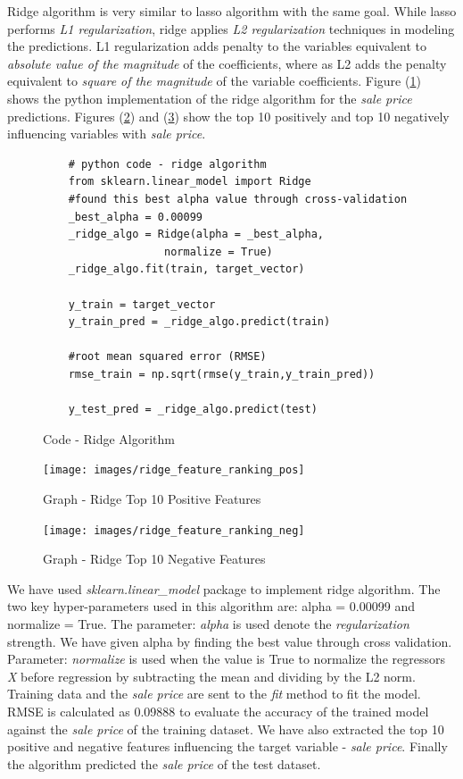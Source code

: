 \documentclass[sigconf]{acmart}
\begin{document}
	Ridge algorithm is very similar to lasso algorithm with the same goal. While lasso performs {\em L1 regularization}, ridge applies {\em L2 regularization} techniques in modeling the predictions. L1 regularization adds penalty to the variables equivalent to {\em absolute value of the magnitude} of the coefficients, where as L2 adds the penalty equivalent to {\em square of the magnitude} of the variable coefficients. Figure (\ref{c:ridge}) shows the python implementation of the ridge algorithm for the {\em sale price} predictions. Figures ({\ref{fig:ridge-feature-ranking-pos}}) and (\ref{fig:ridge-feature-ranking-neg}) show the top 10 positively and top 10 negatively influencing variables with {\em sale price}.
		
	\begin{figure}[htb]
	\begin{verbatim}
	# python code - ridge algorithm
	from sklearn.linear_model import Ridge
	#found this best alpha value through cross-validation
	_best_alpha = 0.00099	
	_ridge_algo = Ridge(alpha = _best_alpha, 
	               normalize = True)	               	
	_ridge_algo.fit(train, target_vector)
		
	y_train = target_vector
	y_train_pred = _ridge_algo.predict(train)
	
	#root mean squared error (RMSE)
	rmse_train = np.sqrt(rmse(y_train,y_train_pred))	
	
	y_test_pred = _ridge_algo.predict(test)	

	\end{verbatim}
	\caption{Code - Ridge Algorithm} \label{c:ridge} 
	\end{figure}
		
	\begin{figure}[htb]
		\centering
		\texttt{[image: images/ridge\_feature\_ranking\_pos]}	
		\caption{Graph - Ridge Top 10 Positive Features} \label{fig:ridge-feature-ranking-pos} 
	\end{figure}

	\begin{figure}[htb]
		\centering
		\texttt{[image: images/ridge\_feature\_ranking\_neg]}	
		\caption{Graph - Ridge Top 10 Negative Features} \label{fig:ridge-feature-ranking-neg} 
	\end{figure}

     We have used {\em sklearn.linear\_model} package to implement ridge algorithm. The two key hyper-parameters used in this algorithm are: alpha = 0.00099 and normalize = True. The parameter: {\em alpha} is used  denote the {\em regularization} strength. We have given alpha by finding the best value through cross validation. Parameter: {\em normalize} is used when the value is True to normalize the regressors {\em X} before regression by subtracting the mean and dividing by the L2 norm.  Training data and the {\em sale price} are sent to the {\em fit} method to fit the model. RMSE is calculated as 0.09888 to evaluate the accuracy of the trained model against the {\em sale price} of the training dataset. We have also extracted the top 10 positive and negative features influencing the target variable - {\em sale price}. Finally the algorithm predicted the {\em sale price} of the test dataset. 
    
\end{document}
